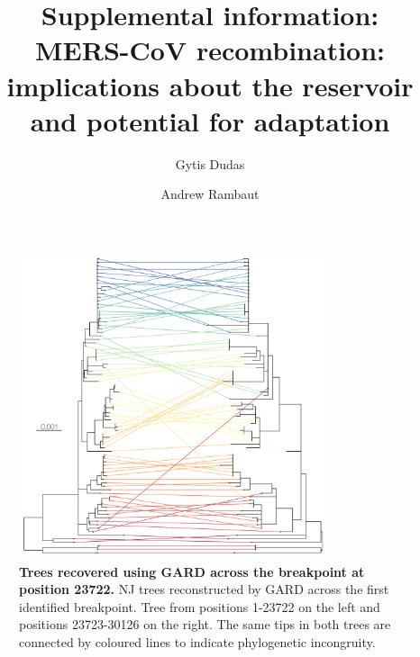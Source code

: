 \documentclass[11pt,oneside,letterpaper]{article}
\begin{document}
\title{\vspace{1.0cm} \huge \bf Supplemental information:\\ \LARGE MERS-CoV recombination: implications about the reservoir and potential for adaptation}

\author[1]{Gytis Dudas}
\author[1,2,3]{Andrew Rambaut}



\maketitle

\setcounter{figure}{0}
\setcounter{table}{0}
\renewcommand{\thefigure}{S\arabic{figure}}
\renewcommand{\thetable}{S\arabic{table}}

\begin{figure}[h]
	\centering	
	\includegraphics[width=0.8\textwidth]{figures/supp_MERS_GARDtrees.png}
	\caption{\textbf{Trees recovered using GARD across the breakpoint at position 23722.}
NJ trees reconstructed by GARD across the first identified breakpoint.
Tree from positions 1-23722 on the left and positions 23723-30126 on the right.
The same tips in both trees are connected by coloured lines to indicate phylogenetic incongruity.}
	\label{GARD_trees}
\end{figure}
\end{document}
